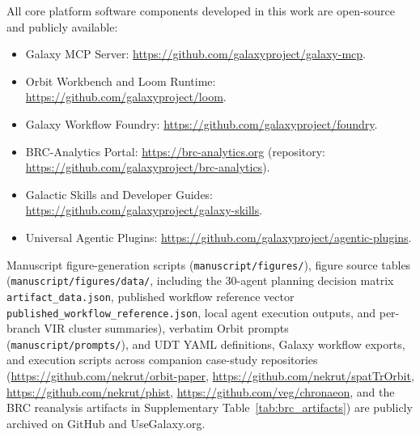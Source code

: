 \documentclass[11pt,letterpaper]{article}
\newcommand{\tool}[1]{\textsf{#1}}
\begin{document}
All core platform software components developed in this work are open-source and publicly available:
\begin{itemize}
    \item Galaxy MCP Server: \url{https://github.com/galaxyproject/galaxy-mcp}.
    \item \tool{Orbit} Workbench and Loom Runtime: \url{https://github.com/galaxyproject/loom}.
    \item Galaxy \tool{Workflow Foundry}: \url{https://github.com/galaxyproject/foundry}.
    \item \tool{BRC-Analytics} Portal: \url{https://brc-analytics.org} (repository: \url{https://github.com/galaxyproject/brc-analytics}).
    \item Galactic Skills and Developer Guides: \url{https://github.com/galaxyproject/galaxy-skills}.
    \item Universal Agentic Plugins: \url{https://github.com/galaxyproject/agentic-plugins}.
\end{itemize}
Manuscript figure-generation scripts (\nolinkurl{manuscript/figures/}), figure source tables (\nolinkurl{manuscript/figures/data/}, including the 30-agent planning decision matrix \nolinkurl{artifact_data.json}, published workflow reference vector \nolinkurl{published_workflow_reference.json}, local agent execution outputs, and per-branch VIR cluster summaries), verbatim \tool{Orbit} prompts (\nolinkurl{manuscript/prompts/}), and UDT YAML definitions, Galaxy workflow exports, and execution scripts across companion case-study repositories (\url{https://github.com/nekrut/orbit-paper}, \url{https://github.com/nekrut/spatTrOrbit}, \url{https://github.com/nekrut/phist}, \url{https://github.com/veg/chronaeon}, and the BRC reanalysis artifacts in Supplementary Table~\ref{tab:brc_artifacts}) are publicly archived on GitHub and UseGalaxy.org.
\end{document}
